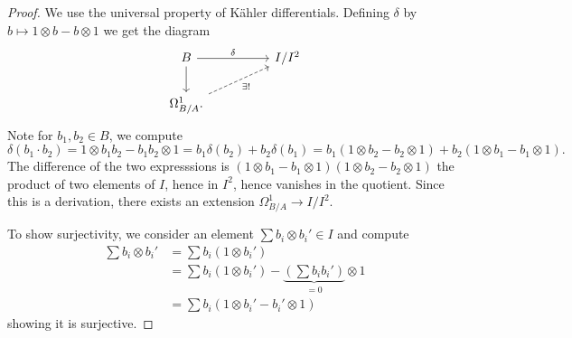 \begin{proof}
    We use the universal property of K\"{a}hler differentials. Defining $\delta$ by $b\mapsto 1\otimes b-b\otimes 1$ we get the diagram 
    $$%
    \begin{tikzcd}
        B && {I/I^{2}} \\
        {\Omega_{B/A}^{1}.}
        \arrow["\delta", from=1-1, to=1-3]
        \arrow[from=1-1, to=2-1]
        \arrow["{\exists!}"', dashed, from=2-1, to=1-3]
    \end{tikzcd}$$
    Note for $b_{1},b_{2}\in B$, we compute 
    $$\delta(b_{1}\cdot b_{2})=1\otimes b_{1}b_{2}-b_{1}b_{2}\otimes 1=b_{1}\delta(b_{2})+b_{2}\delta(b_{1})=b_{1}(1\otimes b_{2}-b_{2}\otimes 1)+b_{2}(1\otimes b_{1}-b_{1}\otimes 1).$$
    The difference of the two expresssions is $(1\otimes b_{1}-b_{1}\otimes 1)(1\otimes b_{2}-b_{2}\otimes 1)$ the product of two elements of $I$, hence in $I^{2}$, hence vanishes in the quotient. Since this is a derivation, there exists an extension $\Omega^{1}_{B/A}\to I/I^{2}$.
    
    To show surjectivity, we consider an element $\sum b_{i}\otimes b_{i}'\in I$ and compute 
    \begin{align*}
        \sum b_{i}\otimes b_{i}'&=\sum b_{i}(1\otimes b_{i}')\\
        &=\sum b_{i}(1\otimes b_{i}')-\underbrace{\left(\sum b_{i}b_{i}'\right)}_{=0}\otimes 1 \\
        &= \sum b_{i}(1\otimes b_{i}'-b_{i}'\otimes 1)
    \end{align*}
    showing it is surjective. 


\end{proof}

